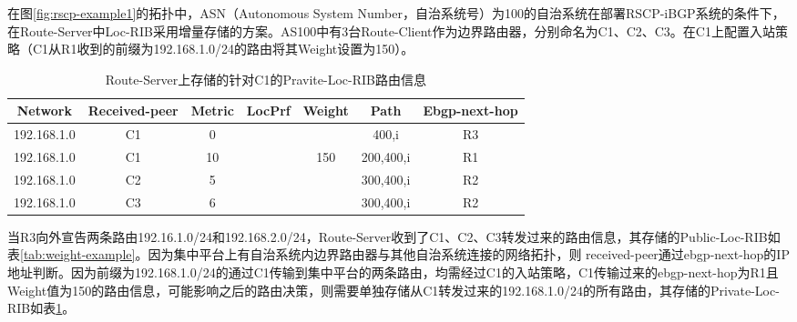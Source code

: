 在图\ref{fig:rscp-example1}的拓扑中，ASN（Autonomous System Number，自治系统号）为100的自治系统在部署RSCP-iBGP系统的条件下，在Route-Server中Loc-RIB采用增量存储的方案。AS100中有3台Route-Client作为边界路由器，分别命名为C1、C2、C3。在C1上配置入站策略（C1从R1收到的前缀为192.168.1.0/24的路由将其Weight设置为150）。





\begin{table}[h]
	\centering
	\caption{Route-Server上存储的针对C1的Pravite-Loc-RIB路由信息}
    \label{tab:c1-loc-rib}
	\begin{tabular}{@{}ccccccc@{}}
    \toprule
    Network     & Received-peer & Metric & LocPrf & Weight & Path      & Ebgp-next-hop \\ \midrule
    192.168.1.0 & C1            & 0      &        &        & 400,i     & R3            \\
    192.168.1.0 & C1            & 10     &        & 150    & 200,400,i & R1            \\
    192.168.1.0 & C2            & 5      &        &        & 300,400,i & R2            \\
    192.168.1.0 & C3            & 6      &        &        & 300,400,i & R2            \\ \bottomrule
   \end{tabular}
\end{table}

当R3向外宣告两条路由192.16.1.0/24和192.168.2.0/24，Route-Server收到了C1、C2、C3转发过来的路由信息，其存储的Public-Loc-RIB如表\ref{tab:weight-example}。因为集中平台上有自治系统内边界路由器与其他自治系统连接的网络拓扑，则 received-peer通过ebgp-next-hop的IP地址判断。因为前缀为192.168.1.0/24的通过C1传输到集中平台的两条路由，均需经过C1的入站策略，C1传输过来的ebgp-next-hop为R1且Weight值为150的路由信息，可能影响之后的路由决策，则需要单独存储从C1转发过来的192.168.1.0/24的所有路由，其存储的Private-Loc-RIB如表\ref{tab:c1-loc-rib}。


